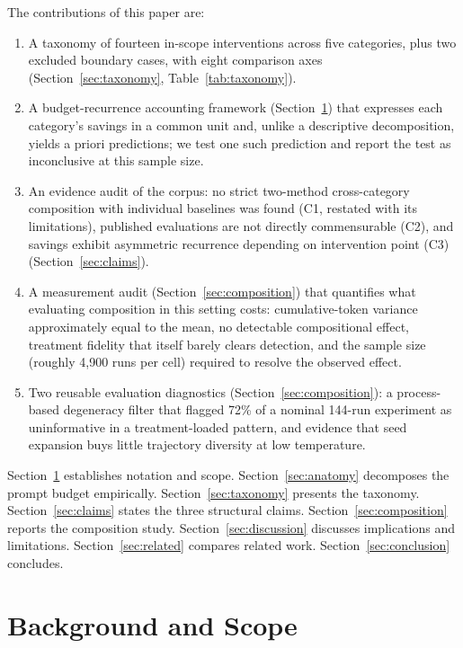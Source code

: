 \documentclass{article}
\begin{document}
The contributions of this paper are:
\begin{enumerate}
\item A taxonomy of fourteen in-scope interventions across five categories, plus two excluded boundary cases, with eight comparison axes (Section~\ref{sec:taxonomy}, Table~\ref{tab:taxonomy}).
\item A budget-recurrence accounting framework (Section~\ref{sec:background}) that expresses each category's savings in a common unit and, unlike a descriptive decomposition, yields a priori predictions; we test one such prediction and report the test as inconclusive at this sample size.
\item An evidence audit of the corpus: no strict two-method cross-category composition with individual baselines was found (C1, restated with its limitations), published evaluations are not directly commensurable (C2), and savings exhibit asymmetric recurrence depending on intervention point (C3) (Section~\ref{sec:claims}).
\item A measurement audit (Section~\ref{sec:composition}) that quantifies what evaluating composition in this setting costs: cumulative-token variance approximately equal to the mean, no detectable compositional effect, treatment fidelity that itself barely clears detection, and the sample size (roughly 4{,}900 runs per cell) required to resolve the observed effect.
\item Two reusable evaluation diagnostics (Section~\ref{sec:composition}): a process-based degeneracy filter that flagged 72\% of a nominal 144-run experiment as uninformative in a treatment-loaded pattern, and evidence that seed expansion buys little trajectory diversity at low temperature.
\end{enumerate}

Section~\ref{sec:background} establishes notation and scope. Section~\ref{sec:anatomy} decomposes the prompt budget empirically. Section~\ref{sec:taxonomy} presents the taxonomy. Section~\ref{sec:claims} states the three structural claims. Section~\ref{sec:composition} reports the composition study. Section~\ref{sec:discussion} discusses implications and limitations. Section~\ref{sec:related} compares related work. Section~\ref{sec:conclusion} concludes.

\section{Background and Scope}
\label{sec:background}
\end{document}
